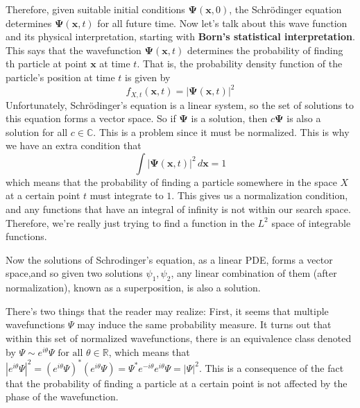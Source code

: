 \documentclass{article}
\begin{document}
    Therefore, given suitable initial conditions $\boldsymbol{\Psi}(\mathbf{x}, 0)$, the Schr\"odinger equation determines $\boldsymbol{\Psi}(\mathbf{x}, t)$ for all future time. Now let's talk about this wave function and its physical interpretation, starting with \textbf{Born's statistical interpretation}. This says that the wavefunction $\boldsymbol{\Psi}(\mathbf{x}, t)$ determines the probability of finding th particle at point $\mathbf{x}$ at time $t$. That is, the probability density function of the particle's position at time $t$ is given by 
    \begin{equation} 
      f_{X, t} (\mathbf{x}, t) = |\boldsymbol{\Psi}(\mathbf{x}, t)|^2
    \end{equation}
    Unfortunately, Schr\"odinger's equation is a linear system, so the set of solutions to this equation forms a vector space. So if $\boldsymbol{\Psi}$ is a solution, then $c \boldsymbol{\Psi}$ is also a solution for all $c \in \mathbb{C}$. This is a problem since it must be normalized. This is why we have an extra condition that 
    \begin{equation} 
    \int |\boldsymbol{\Psi}(\mathbf{x}, t)|^2 \,d \mathbf{x} = 1
    \end{equation}
    which means that the probability of finding a particle somewhere in the space $X$ at a certain point $t$ must integrate to $1$. This gives us a normalization condition, and any functions that have an integral of infinity is not within our search space. Therefore, we're really just trying to find a function in the $L^2$ space of integrable functions. 

    \begin{definition}[Superposition]
      \label{def:superposition}
      Now the solutions of Schrodinger's equation, as a linear PDE, forms a vector space,and so given two solutions $\psi_1, \psi_2$, any linear combination of them (after normalization), known as a superposition, is also a solution.
    \end{definition}

    There's two things that the reader may realize: First, it seems that multiple wavefunctions $\Psi$ may induce the same probability measure. It turns out that within this set of normalized wavefunctions, there is an equivalence class denoted by $\Psi \sim e^{i \theta} \Psi \text{ for all } \theta \in \mathbb{R}$, which means that $|e^{i \theta} \Psi|^2 = (e^{i \theta} \Psi)^\ast (e^{i \theta} \Psi) = \Psi^\ast e^{-i \theta} e^{i \theta} \Psi = |\Psi|^2$. This is a consequence of the fact that the probability of finding a particle at a certain point is not affected by the phase of the wavefunction.
\end{document}
